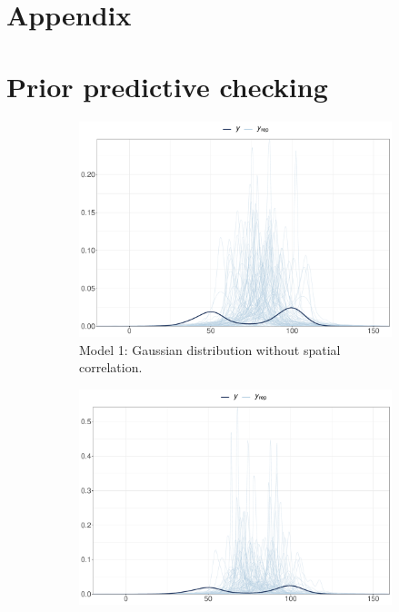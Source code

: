 \documentclass[a4paper]{article}   	%
\begin{document}
	
	
	\appendix
	\section*{Appendix}
	
	\section{Prior predictive checking}\label{App:Prior}
	
	\begin{figure}[!htp]
		\centering
		\begin{subfigure}[t]{0.45\textwidth}
			\includegraphics[width=\linewidth]{Images/prior_GSRNS}
			\caption{Model 1: Gaussian distribution without spatial correlation.}
		\end{subfigure}
		\begin{subfigure}[t]{0.45\textwidth}
			\includegraphics[width=\linewidth]{Images/prior_GSRand}

\end{subfigure}
\end{figure}
\end{document}
